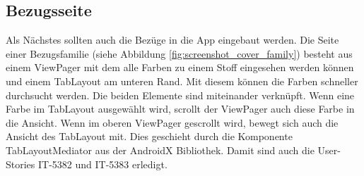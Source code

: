 \FloatBarrier
\subsection{Bezugsseite}


Als Nächstes sollten auch die Bezüge in die App eingebaut werden. Die Seite einer Bezugsfamilie (siehe Abbildung \ref{fig:screenshot_cover_family}) besteht aus einem ViewPager mit dem alle Farben zu einem Stoff eingesehen werden können und einem TabLayout am unteren Rand. Mit diesem können die Farben schneller durchsucht werden. Die beiden Elemente sind miteinander verknüpft. Wenn eine Farbe im TabLayout ausgewählt wird, scrollt der ViewPager auch diese Farbe in die Ansicht. Wenn im oberen ViewPager gescrollt wird, bewegt sich auch die Ansicht des TabLayout mit. Dies geschieht durch die Komponente TabLayoutMediator aus der AndroidX Bibliothek. Damit sind auch die User-Stories IT-5382 und IT-5383 erledigt.

